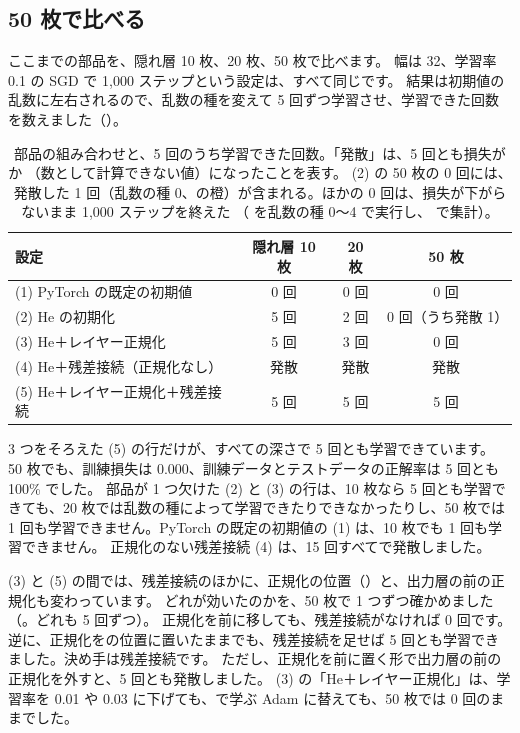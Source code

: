 \subsection*{50 枚で比べる}

ここまでの部品を、隠れ層 10 枚、20 枚、50 枚で比べます。
幅は 32、学習率 0.1 の SGD で 1,000 ステップという設定は、すべて同じです。
結果は初期値の乱数に左右されるので、乱数の種を変えて 5 回ずつ学習させ、学習できた回数を数えました（）。

\begin{table}[tbp]
\centering
\caption{部品の組み合わせと、5 回のうち学習できた回数。「発散」は、5 回とも損失が  か （数として計算できない値）になったことを表す。
(2) の 50 枚の 0 回には、発散した 1 回（乱数の種 0、の橙）が含まれる。ほかの 0 回は、損失が下がらないまま 1,000 ステップを終えた
（\protect{} を乱数の種 0〜4 で実行し、\protect{} で集計）。}
\label{tab:training-depth}
\small
\begin{tabular}{lccc}
\toprule
設定 & 隠れ層 10 枚 & 20 枚 & 50 枚 \\
\midrule
(1) PyTorch の既定の初期値 & 0 回 & 0 回 & 0 回 \\
(2) He の初期化 & 5 回 & 2 回 & 0 回（うち発散 1） \\
(3) He＋レイヤー正規化 & 5 回 & 3 回 & 0 回 \\
(4) He＋残差接続（正規化なし） & 発散 & 発散 & 発散 \\
(5) He＋レイヤー正規化＋残差接続 & 5 回 & 5 回 & 5 回 \\
\bottomrule
\end{tabular}
\end{table}

3 つをそろえた (5) の行だけが、すべての深さで 5 回とも学習できています。
50 枚でも、訓練損失は 0.000、訓練データとテストデータの正解率は 5 回とも 100\% でした。
部品が 1 つ欠けた (2) と (3) の行は、10 枚なら 5 回とも学習できても、20 枚では乱数の種によって学習できたりできなかったりし、50 枚では 1 回も学習できません。PyTorch の既定の初期値の (1) は、10 枚でも 1 回も学習できません。
正規化のない残差接続 (4) は、15 回すべてで発散しました。

(3) と (5) の間では、残差接続のほかに、正規化の位置（）と、出力層の前の正規化も変わっています。
どれが効いたのかを、50 枚で 1 つずつ確かめました（。どれも 5 回ずつ）。
正規化を前に移しても、残差接続がなければ 0 回です。
逆に、正規化をの位置に置いたままでも、残差接続を足せば 5 回とも学習できました。決め手は残差接続です。
ただし、正規化を前に置く形で出力層の前の正規化を外すと、5 回とも発散しました。
(3) の「He＋レイヤー正規化」は、学習率を 0.01 や 0.03 に下げても、で学ぶ Adam に替えても、50 枚では 0 回のままでした。

